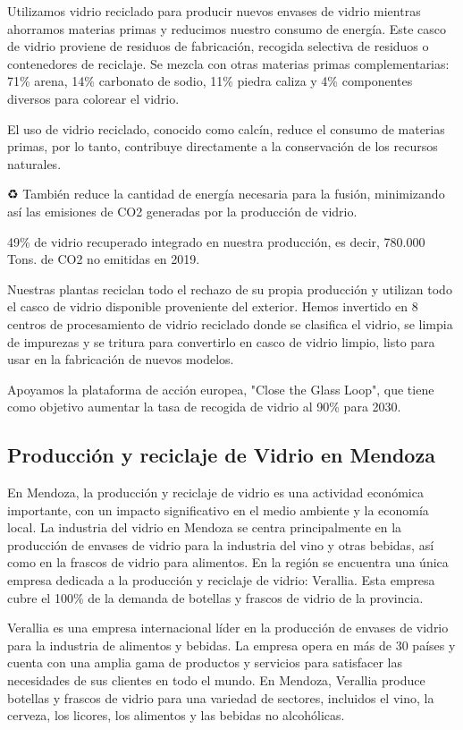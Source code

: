 \documentclass[main.tex]{subfiles}
\begin{document}
Utilizamos vidrio reciclado para producir nuevos envases de vidrio mientras ahorramos materias primas y reducimos nuestro consumo de energía. Este casco de vidrio proviene de residuos de fabricación, recogida selectiva de residuos o contenedores de reciclaje. Se mezcla con otras materias primas complementarias: 71\% arena, 14\% carbonato de sodio, 11\% piedra caliza y 4\% componentes diversos para colorear el vidrio.

El uso de vidrio reciclado, conocido como calcín, reduce el consumo de materias primas, por lo tanto, contribuye directamente a la conservación de los recursos naturales.

♻️ También reduce la cantidad de energía necesaria para la fusión, minimizando así las emisiones de CO2 generadas por la producción de vidrio.

49\% de vidrio recuperado integrado en nuestra producción, es decir, 780.000 Tons. de CO2 no emitidas en 2019. 

Nuestras plantas reciclan todo el rechazo de su propia producción y utilizan todo el casco de vidrio disponible proveniente del exterior. Hemos invertido en 8 centros de procesamiento de vidrio reciclado donde se clasifica el vidrio, se limpia de impurezas y se tritura para convertirlo en casco de vidrio limpio, listo para usar en la fabricación de nuevos modelos.

Apoyamos la plataforma de acción europea, "Close the Glass Loop", que tiene como objetivo aumentar la tasa de recogida de vidrio al 90\% para 2030.

\subsection{Producción y reciclaje de Vidrio en Mendoza}

En Mendoza, la producción y reciclaje de vidrio es una actividad económica importante, con un impacto significativo en el medio ambiente y la economía local. La industria del vidrio en Mendoza se centra principalmente en la producción de envases de vidrio para la industria del vino y otras bebidas, así como en la frascos de vidrio para alimentos. En la región se encuentra una única empresa dedicada a la producción y reciclaje de vidrio: Verallia. Esta empresa cubre el 100\% de la demanda de botellas y frascos de vidrio de la provincia.

Verallia es una empresa internacional líder en la producción de envases de vidrio para la industria de alimentos y bebidas. La empresa opera en más de 30 países y cuenta con una amplia gama de productos y servicios para satisfacer las necesidades de sus clientes en todo el mundo. En Mendoza, Verallia produce botellas y frascos de vidrio para una variedad de sectores, incluidos el vino, la cerveza, los licores, los alimentos y las bebidas no alcohólicas.
\end{document}
